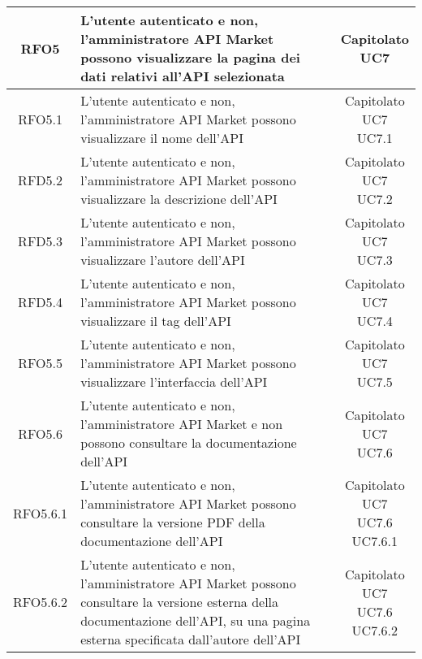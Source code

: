 \begin{longtable}{|c|p{8cm}|c|}
RFO5 & L'utente autenticato e non, l'amministratore API Market possono visualizzare la pagina dei dati relativi all'API selezionata & \makecell*{Capitolato\\UC7} \\
\hline

RFO5.1 & L'utente autenticato e non, l'amministratore API Market possono visualizzare il nome dell'API & \makecell*{Capitolato\\UC7\\UC7.1} \\
\hline

RFD5.2 & L'utente autenticato e non, l'amministratore API Market possono visualizzare la descrizione dell'API & \makecell*{Capitolato\\UC7\\UC7.2} \\
\hline

RFD5.3 & L'utente autenticato e non, l'amministratore API Market possono visualizzare l'autore dell'API & \makecell*{Capitolato\\UC7\\UC7.3} \\
\hline

RFD5.4 & L'utente autenticato e non, l'amministratore API Market possono visualizzare il tag dell'API & \makecell*{Capitolato\\UC7\\UC7.4} \\
\hline

RFO5.5 & L'utente autenticato e non, l'amministratore API Market possono visualizzare l'interfaccia dell'API & \makecell*{Capitolato\\UC7\\UC7.5} \\
\hline

RFO5.6 & L'utente autenticato e non, l'amministratore API Market e non possono consultare la documentazione dell'API & \makecell*{Capitolato\\UC7\\UC7.6} \\
\hline

RFO5.6.1 & L'utente autenticato e non, l'amministratore API Market possono consultare la versione PDF della documentazione dell'API & \makecell*{Capitolato\\UC7\\UC7.6\\UC7.6.1} \\
\hline

RFO5.6.2 &  L'utente autenticato e non, l'amministratore API Market possono consultare la versione esterna della documentazione dell'API, su una pagina esterna specificata dall'autore dell'API  & \makecell*{Capitolato\\UC7\\UC7.6\\UC7.6.2} \\
\hline


\end{longtable}

